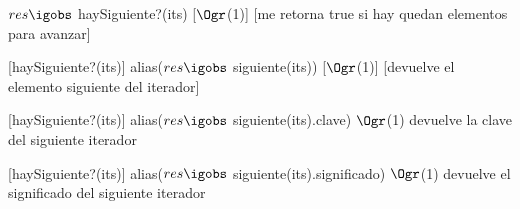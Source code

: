 \begin{Interfaz}
	{$res \igobs$ haySiguiente?(its)}
	[$\Ogr$(1)]
	[me retorna true si hay quedan elementos para avanzar]
	
	[haySiguiente?(its)]
	{alias($res \igobs$ siguiente(its))}
	[$\Ogr$(1)]
	[devuelve el elemento siguiente del iterador]
	
	[haySiguiente?(its)]
	{alias($res \igobs$ siguiente(its).clave)}
	{$\Ogr$(1)}
	{devuelve la clave del siguiente iterador}
	
	[haySiguiente?(its)]
	{alias($res \igobs$ siguiente(its).significado)}
	{$\Ogr$(1)}
	{devuelve el significado del siguiente iterador}


\end{Interfaz}

